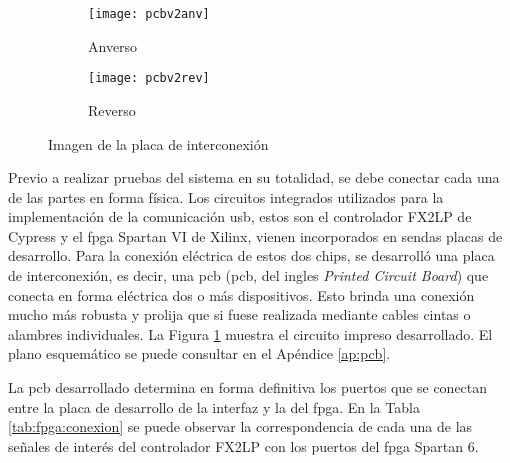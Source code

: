 \begin{figure}[ht]
	\centering
	\begin{subfigure}[t]{0.45\textwidth}
		\centering
		\texttt{[image: pcbv2anv]}
		\caption*{Anverso}
	\end{subfigure}
	\begin{subfigure}[t]{0.45\textwidth}
		\centering
		\texttt{[image: pcbv2rev]}
		\caption*{Reverso}
	\end{subfigure}
	\caption{Imagen de la placa de interconexión}
	\label{fpga:pcb:v2}
\end{figure}

Previo a realizar pruebas del sistema en su totalidad, se debe conectar cada una de las partes en forma física. Los circuitos integrados utilizados para la implementación de la comunicación \acrshort{usb}, estos son el controlador FX2LP de Cypress y el \acrshort{fpga} Spartan VI de Xilinx, vienen incorporados en sendas placas de desarrollo. Para la conexión eléctrica de estos dos chips, se desarrolló una placa de interconexión, es decir, una \acrlong{pcb} (\acrshort{pcb}, del ingles {\it Printed Circuit Board}) que conecta en forma eléctrica dos o más dispositivos. Esto brinda una conexión mucho más robusta y prolija que si fuese realizada mediante cables cintas o alambres individuales. La Figura \ref{fpga:pcb:v2} muestra el circuito impreso desarrollado. El plano esquemático se puede consultar en el Apéndice \ref{ap:pcb}.

La \acrshort{pcb} desarrollado determina en forma definitiva los puertos que se conectan entre la placa de desarrollo de la interfaz y la del \acrshort{fpga}. En la Tabla \ref{tab:fpga:conexion} se puede observar la correspondencia de cada una de las señales de interés del controlador FX2LP con los puertos del \acrshort{fpga} Spartan 6.


